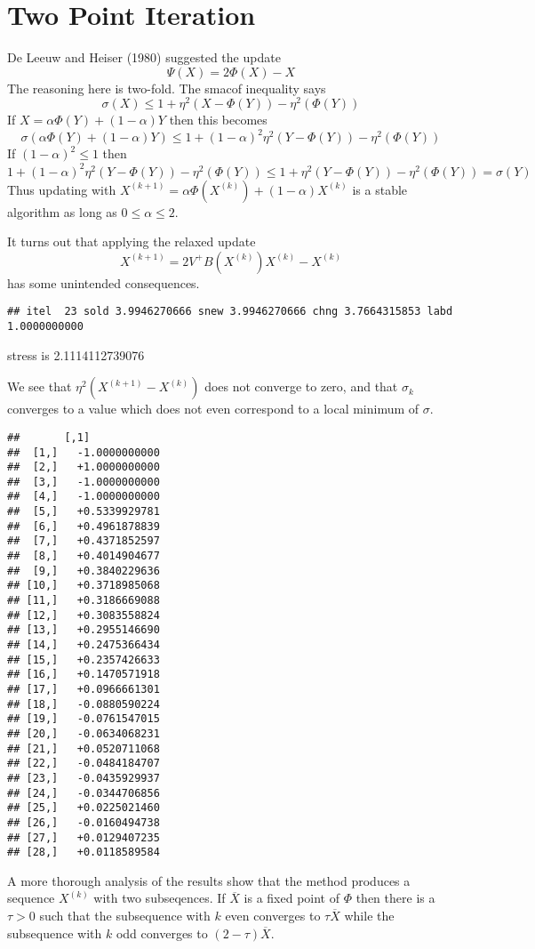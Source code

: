 \documentclass[
  12pt,
]{article}
\begin{document}
\section{Two Point Iteration}\label{two-point-iteration}

De Leeuw and Heiser (1980) suggested the update
\[
\Psi(X)=2\Phi(X)-X
\]
The reasoning here is two-fold. The smacof inequality says
\[
\sigma(X)\leq 1+\eta^2(X-\Phi(Y))-\eta^2(\Phi(Y))
\]
If \(X=\alpha\Phi(Y)+(1-\alpha)Y\) then this becomes
\[
\sigma(\alpha\Phi(Y)+(1-\alpha)Y)\leq 1+(1-\alpha)^2\eta^2(Y-\Phi(Y))-\eta^2(\Phi(Y))
\]
If \((1-\alpha)^2\leq 1\) then
\[
1+(1-\alpha)^2\eta^2(Y-\Phi(Y))-\eta^2(\Phi(Y))\leq 1+\eta^2(Y-\Phi(Y))-\eta^2(\Phi(Y))=\sigma(Y)
\]
Thus updating with \(X^{(k+1)}=\alpha\Phi(X^{(k)})+(1-\alpha)X^{(k)}\) is a stable
algorithm as long as \(0\leq\alpha\leq 2\).

It turns out that applying the relaxed update
\[
X^{(k+1)}=2V^+B(X^{(k)})X^{(k)}-X^{(k)}
\]
has some unintended consequences.

\begin{verbatim}
## itel  23 sold 3.9946270666 snew 3.9946270666 chng 3.7664315853 labd 1.0000000000
\end{verbatim}

stress is 2.1114112739076

We see that \(\eta^2(X^{(k+1)}-X^{(k)})\) does not converge to zero, and that
\(\sigma_k\) converges to a value which does not even correspond to a local minimum
of \(\sigma\).

\begin{verbatim}
##       [,1]           
##  [1,]   -1.0000000000
##  [2,]   +1.0000000000
##  [3,]   -1.0000000000
##  [4,]   -1.0000000000
##  [5,]   +0.5339929781
##  [6,]   +0.4961878839
##  [7,]   +0.4371852597
##  [8,]   +0.4014904677
##  [9,]   +0.3840229636
## [10,]   +0.3718985068
## [11,]   +0.3186669088
## [12,]   +0.3083558824
## [13,]   +0.2955146690
## [14,]   +0.2475366434
## [15,]   +0.2357426633
## [16,]   +0.1470571918
## [17,]   +0.0966661301
## [18,]   -0.0880590224
## [19,]   -0.0761547015
## [20,]   -0.0634068231
## [21,]   +0.0520711068
## [22,]   -0.0484184707
## [23,]   -0.0435929937
## [24,]   -0.0344706856
## [25,]   +0.0225021460
## [26,]   -0.0160494738
## [27,]   +0.0129407235
## [28,]   +0.0118589584
\end{verbatim}

A more thorough analysis of the results show that the method produces a sequence
\(X^{(k)}\) with two subseqences. If \(\overline{X}\) is a fixed point of
\(\Phi\) then there is a \(\tau>0\) such that
the subsequence with \(k\) even converges to \(\tau\overline{X}\)
while the subsequence with \(k\) odd converges to \((2-\tau)\overline{X}\).
\end{document}
